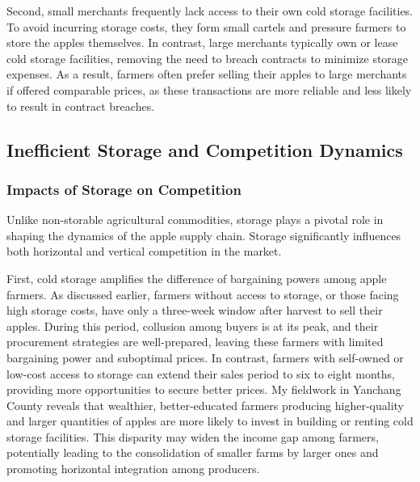 Second, small merchants frequently lack access to their own cold storage facilities. To avoid incurring storage costs, they form small cartels and pressure farmers to store the apples themselves. In contrast, large merchants typically own or lease cold storage facilities, removing the need to breach contracts to minimize storage expenses. As a result, farmers often prefer selling their apples to large merchants if offered comparable prices, as these transactions are more reliable and less likely to result in contract breaches.







\subsection{Inefficient Storage and Competition Dynamics}


\subsubsection{Impacts of Storage on Competition}
Unlike non-storable agricultural commodities, storage plays a pivotal role in shaping the dynamics of the apple supply chain. Storage significantly influences both horizontal and vertical competition in the market.

First, cold storage amplifies the difference of bargaining powers among apple farmers. As discussed earlier, farmers without access to storage, or those facing high storage costs, have only a three-week window after harvest to sell their apples. During this period, collusion among buyers is at its peak, and their procurement strategies are well-prepared, leaving these farmers with limited bargaining power and suboptimal prices. In contrast, farmers with self-owned or low-cost access to storage can extend their sales period to six to eight months, providing more opportunities to secure better prices. My fieldwork in Yanchang County reveals that wealthier, better-educated farmers producing higher-quality and larger quantities of apples are more likely to invest in building or renting cold storage facilities. This disparity may widen the income gap among farmers, potentially leading to the consolidation of smaller farms by larger ones and promoting horizontal integration among producers.

